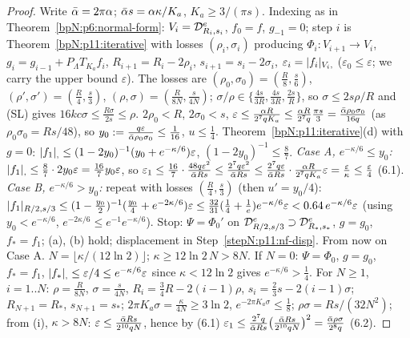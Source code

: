 \begin{proof}
Write $\bar\alpha=2\pi\alpha$; $\bar\alpha s=\alpha\kappa/K_a$, $K_a\ge3/(\pi s)$. Indexing as in Theorem~\ref{bpN:p6:normal-form}: $V_i=\mathcal D_{R_i,s_i}^e$, $f_0=f$, $g_{-1}=0$; step $i$ is Theorem~\ref{bpN:p11:iterative} with losses $(\rho_i,\sigma_i)$ producing $\Phi_i:V_{i+1}\to V_i$, $g_i=g_{i-1}+P_\Lambda T_{K_a}f_i$, $R_{i+1}=R_i-2\rho_i$, $s_{i+1}=s_i-2\sigma_i$, $\varepsilon_i=\lvert f_i\rvert_{V_i,}$ ($\varepsilon_0\le\varepsilon$; we carry the upper bound $\varepsilon$).
\label{stepN:p11:nf-sl} The losses are $(\rho_0,\sigma_0)=(\frac R8,\frac s6)$, $(\rho',\sigma')=(\frac R4,\frac s3)$, $(\rho,\sigma)=(\frac R{8N},\frac s{4N})$; $\sigma/\rho\in\{\frac{4s}{3R},\frac{4s}{3R},\frac{2s}R\}$, so $\sigma\le2s\rho/R$ and \textup{(SL)} gives $16kc\sigma\le\frac{R\sigma}{2s}\le\rho$.
\label{stepN:p11:nf-first} $2\rho_0<R$, $2\sigma_0<s$, $\varepsilon\le\frac{\alpha R}{2^7qK_a}\le\frac{\alpha R}{2^7q}\frac{\pi s}3=\frac{\bar\alpha\rho_0\sigma_0}{16q}$ (as $\rho_0\sigma_0=Rs/48$), so $y_0:=\frac{q\varepsilon}{\bar\alpha\rho_0\sigma_0}\le\frac1{16}$, $u\le\frac14$.
\label{stepN:p11:nf-case} Theorem~\ref{bpN:p11:iterative}(d) with $g=0$: $\lvert f_1\rvert_{,}\le(1-2y_0)^{-1}(y_0+e^{-\kappa/6})\varepsilon$, $(1-2y_0)^{-1}\le\frac87$.
\emph{Case A, $e^{-\kappa/6}\le y_0$:} $\lvert f_1\rvert_{,}\le\frac87\cdot2y_0\varepsilon=\frac{16}7y_0\varepsilon$, so $\varepsilon_1\le\frac{16}7\cdot\frac{48q\varepsilon^2}{\bar\alpha Rs}\le\frac{2^7q\varepsilon^2}{\bar\alpha Rs}\le\frac{2^7q\varepsilon}{\bar\alpha Rs}\cdot\frac{\alpha R}{2^7qK_a}\varepsilon=\frac\varepsilon\kappa\le\frac\varepsilon4$ (6.1).
\emph{Case B, $e^{-\kappa/6}>y_0$:} repeat with losses $(\frac R4,\frac s3)$ (then $u'=y_0/4$): $\lvert f_1\rvert_{R/2,s/3}\le(1-\frac{y_0}2)^{-1}(\frac{y_0}4+e^{-2\kappa/6})\varepsilon\le\frac{32}{31}(\frac14+\frac1e)e^{-\kappa/6}\varepsilon<0.64\,e^{-\kappa/6}\varepsilon$ (using $y_0<e^{-\kappa/6}$, $e^{-2\kappa/6}\le e^{-1}e^{-\kappa/6}$). Stop: $\Psi=\Phi_0'$ on $\mathcal D_{R/2,s/3}^e\supset\mathcal D_{R_*,s_*}^e$, $g=g_0$, $f_*=f_1$; (a), (b) hold; displacement in Step~\ref{stepN:p11:nf-disp}. From now on Case A.
\label{stepN:p11:nf-N} $N=\lfloor\kappa/(12\ln2)\rfloor$; $\kappa\ge12\ln2\,N>8N$. If $N=0$: $\Psi=\Phi_0$, $g=g_0$, $f_*=f_1$, $\lvert f_*\rvert_{,}\le\varepsilon/4\le e^{-\kappa/6}\varepsilon$ since $\kappa<12\ln2$ gives $e^{-\kappa/6}>\frac14$. For $N\ge1$, $i=1..N$: $\rho=\frac R{8N}$, $\sigma=\frac s{4N}$, $R_i=\frac34R-2(i-1)\rho$, $s_i=\frac23s-2(i-1)\sigma$; $R_{N+1}=R_*$, $s_{N+1}=s_*$; $2\pi K_a\sigma=\frac\kappa{4N}\ge3\ln2$, $e^{-2\pi K_a\sigma}\le\frac18$; $\rho\sigma=Rs/(32N^2)$; from (i), $\kappa>8N$: $\varepsilon\le\frac{\bar\alpha Rs}{2^{10}qN}$, hence by (6.1) $\varepsilon_1\le\frac{2^7q}{\bar\alpha Rs}\bigl(\frac{\bar\alpha Rs}{2^{10}qN}\bigr)^2=\frac{\bar\alpha\rho\sigma}{2^8q}$ (6.2).

\end{proof}
